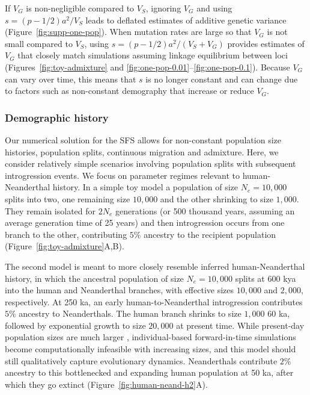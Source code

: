 \documentclass{article}
\begin{document}
If $V_G$ is non-negligible compared to $V_S$, ignoring $V_G$ and using
$s=(p-1/2)a^2/V_S$ leads to deflated estimates of additive genetic variance
(Figure~\ref{fig:supp-one-pop}). When mutation rates are large so that $V_G$ is
not small compared to $V_S$, using $s=(p-1/2)a^2/(V_S+V_G)$ provides estimates
of $V_G$ that closely match simulations assuming linkage equilibrium between
loci (Figures~\ref{fig:toy-admixture} and
\ref{fig:one-pop-0.01}--\ref{fig:one-pop-0.1}). Because $V_G$ can vary over
time, this means that $s$ is no longer constant and can change due to factors
such as non-constant demography that increase or reduce $V_G$.

\subsubsection*{Demographic history}

Our numerical solution for the SFS allows for non-constant population size
histories, population splits, continuous migration and admixture. Here, we
consider relatively simple scenarios involving population splits with
subsequent introgression events. We focus on parameter regimes relevant to
human-Neanderthal history. In a simple toy model a population of size
$N_e=10{,}000$ splits into two, one remaining size $10{,}000$ and the other
shrinking to size $1{,}000$. They remain isolated for $2N_e$ generations (or
500 thousand years, assuming an average generation time of 25 years) and then
introgression occurs from one branch to the other, contributing $5\%$ ancestry
to the recipient population (Figure~\ref{fig:toy-admixture}A,B).

The second model is meant to more closely resemble inferred human-Neanderthal
history, in which the ancestral population of size $N_e=10{,}000$ splits at 600
kya into the human and Neanderthal branches, with effective sizes $10{,}000$
and $2{,}000$, respectively. At 250 ka, an early human-to-Neanderthal
introgression contributes $5\%$ ancestry to Neanderthals. The human branch
shrinks to size $1{,}000$ 60 ka, followed by exponential growth to size
$20,000$ at present time. While present-day population sizes are much larger
\citep{tennessen2012evolution}, individual-based forward-in-time simulations
become computationally infeasible with increasing sizes, and this model should
still qualitatively capture evolutionary dynamics. Neanderthals contribute
$2\%$ ancestry to this bottlenecked and expanding human population at 50 ka,
after which they go extinct (Figure~\ref{fig:human-neand-h2}A).
\end{document}
